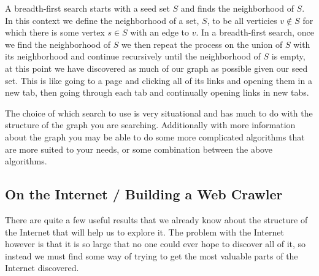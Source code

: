 \documentclass{article}
\begin{document}
	A breadth-first search starts with a seed set $S$ and finds the neighborhood of $S$. In this context we define the neighborhood of a set, $S$, to be all verticies $v\not\in S$ for which there is some vertex $s\in S$ with an edge to $v$. In a breadth-first search, once we find the neighborhood of $S$ we then repeat the process on the union of $S$ with its neighborhood and continue recursively until the neighborhood of $S$ is empty, at this point we have discovered as much of our graph as possible given our seed set. This is like going to a page and clicking all of its links and opening them in a new tab, then going through each tab and continually opening links in new tabs.
	
	The choice of which search to use is very situational and has much to do with the structure of the graph you are searching. Additionally with more information about the graph you may be able to do some more complicated algorithms that are more suited to your needs, or some combination between the above algorithms.
	
	\subsection{On the Internet / Building a Web Crawler}
	There are quite a few useful results that we already know about the structure of the Internet that will help us to explore it. The problem with the Internet however is that it is so large that no one could ever hope to discover all of it, so instead we must find some way of trying to get the most valuable parts of the Internet discovered.
	
\end{document}
